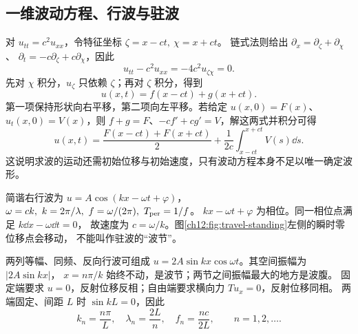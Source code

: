 \subsection{一维波动方程、行波与驻波}

对 $u_{tt}=c^2u_{xx}$，令特征坐标 $\zeta=x-ct,\ \chi=x+ct$。
链式法则给出
$\partial_x=\partial_\zeta+\partial_\chi$、
$\partial_t=-c\partial_\zeta+c\partial_\chi$，因此
\[
 u_{tt}-c^2u_{xx}=-4c^2u_{\zeta\chi}=0.
\]
先对 $\chi$ 积分，$u_\zeta$ 只依赖 $\zeta$；再对 $\zeta$ 积分，得到
\begin{equation}
 u(x,t)=f(x-ct)+g(x+ct).
 \label{ch12:eq:dalembert}
\end{equation}
第一项保持形状向右平移，第二项向左平移。若给定
$u(x,0)=F(x)$、$u_t(x,0)=V(x)$，则
$f+g=F$、$-cf'+cg'=V$，解这两式并积分可得
\[
 u(x,t)=\frac{F(x-ct)+F(x+ct)}2+
 \frac1{2c}\int_{x-ct}^{x+ct}V(s)\dd s.
\]
这说明求波的运动还需初始位移与初始速度，只有波动方程本身不足以唯一确定波形。

简谐右行波为 $u=A\cos(kx-\omega t+\varphi)$，
$\omega=ck,\ k=2\pi/\lambda,\ f=\omega/(2\pi),\ T_{\rm per}=1/f$。
$kx-\omega t+\varphi$ 为相位。同一相位点满足 $k\dd x-\omega\dd t=0$，
故速度为 $c=\omega/k$。图\ref{ch12:fig:travel-standing}左侧的瞬时零位移点会移动，
不能叫作驻波的“波节”。

两列等幅、同频、反向行波可组成
$u=2A\sin kx\cos\omega t$。其空间振幅为 $|2A\sin kx|$，
$x=n\pi/k$ 始终不动，是波节；两节之间振幅最大的地方是波腹。
固定端要求 $u=0$，反射位移反相；自由端要求横向力 $Tu_x=0$，反射位移同相。
两端固定、间距 $L$ 时 $\sin kL=0$，因此
\begin{equation}
 k_n=\frac{n\pi}{L},\quad \lambda_n=\frac{2L}{n},\quad
 f_n=\frac{nc}{2L},\qquad n=1,2,\ldots.
 \label{ch12:eq:fixed-modes}
\end{equation}

\begin{center}\begin{minipage}{\linewidth}\centering
{}
\label{ch12:fig:travel-standing}
\end{minipage}\end{center}

